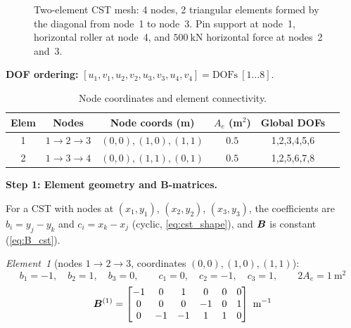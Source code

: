 \begin{example}
\begin{figure}[htbp]
\caption{Two-element CST mesh: 4 nodes, 2 triangular elements formed by the
diagonal from node~1 to node~3. Pin support at node~1, horizontal roller at
node~4, and $500\ \text{kN}$ horizontal force at nodes~2 and~3.}
\label{fig:cst_example}
\end{figure}

\medskip
\noindent\textbf{DOF ordering:}
$[u_1,v_1,u_2,v_2,u_3,v_3,u_4,v_4] = \text{DOFs}\ [1\ldots8]$.

\begin{table}[htbp]
\centering
\small
\caption{Node coordinates and element connectivity.}
\label{tab:cst_elements}
\begin{tabular}{@{}cccccc@{}}
\toprule
Elem & Nodes & Node coords (m) & $A_e$ (m$^2$) & Global DOFs \\
\midrule
1 & $1\to2\to3$ & $(0,0),(1,0),(1,1)$ & $0.5$ & 1,2,3,4,5,6 \\
2 & $1\to3\to4$ & $(0,0),(1,1),(0,1)$ & $0.5$ & 1,2,5,6,7,8 \\
\bottomrule
\end{tabular}
\end{table}


\medskip
\noindent\textbf{Step 1: Element geometry and B-matrices.}

For a CST with nodes at $(x_1,y_1)$, $(x_2,y_2)$, $(x_3,y_3)$, the
coefficients are $b_i = y_j - y_k$ and $c_i = x_k - x_j$
(cyclic, \cref{eq:cst_shape}), and $\bm{B}$ is constant (\cref{eq:B_cst}).

\smallskip
\noindent\textit{Element~1} (nodes $1\to2\to3$, coordinates $(0,0),(1,0),(1,1)$):
\[
    b_1 = -1,\quad b_2 = 1,\quad b_3 = 0,\qquad
    c_1 = 0,\quad c_2 = -1,\quad c_3 = 1,\qquad 2A_e = 1\ \text{m}^2
\]
\begin{equation}
    \bm{B}^{(1)} =
    \begin{bmatrix}
        -1 &  0 &  1 &  0 &  0 &  0 \\
         0 &  0 &  0 & -1 &  0 &  1 \\
         0 & -1 & -1 &  1 &  1 &  0
    \end{bmatrix}\ \text{m}^{-1}
    \label{eq:B1_cst_ex}
\end{equation}


\end{example}
